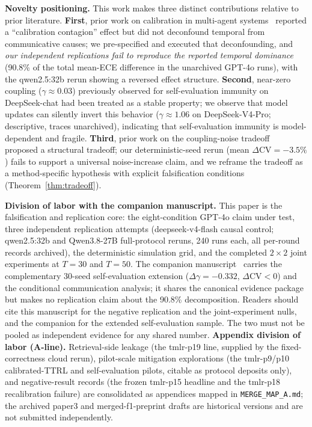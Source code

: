 \documentclass[11pt]{article}
\newcommand{\CV}{\ensuremath{\mathrm{CV}}}
\theoremstyle{definition}
\theoremstyle{remark}
\begin{document}
\textbf{Novelty positioning.} This work makes three distinct contributions relative to prior literature. \textbf{First}, prior work on calibration in multi-agent systems~\citep{huang2026cagecal,epc2026} reported a ``calibration contagion'' effect but did not deconfound temporal from communicative causes; we pre-specified and executed that deconfounding, and \emph{our independent replications fail to reproduce the reported temporal dominance} (90.8\% of the total mean-ECE difference in the unarchived GPT-4o runs), with the qwen2.5:32b rerun showing a reversed effect structure. \textbf{Second}, near-zero coupling ($\gamma \approx 0.03$) previously observed for self-evaluation immunity on DeepSeek-chat had been treated as a stable property; we observe that model updates can silently invert this behavior ($\gamma \approx 1.06$ on DeepSeek-V4-Pro; descriptive, traces unarchived), indicating that self-evaluation immunity is model-dependent and fragile. \textbf{Third}, prior work on the coupling-noise tradeoff~\citep{caleffects2026} proposed a structural tradeoff; our deterministic-seed rerun (mean $\Delta\CV = -3.5\%$) fails to support a universal noise-increase claim, and we reframe the tradeoff as a method-specific hypothesis with explicit falsification conditions (Theorem~\ref{thm:tradeoff}).

\textbf{Division of labor with the companion manuscript.} This paper is the falsification and replication core: the eight-condition GPT-4o claim under test, three independent replication attempts (deepseek-v4-flash causal control; qwen2.5:32b and Qwen3.8-27B full-protocol reruns, 240 runs each, all per-round records archived), the deterministic simulation grid, and the completed $2{\times}2$ joint experiments at $T{=}30$ and $T{=}50$. The companion manuscript~\citep{companion2026} carries the complementary 30-seed self-evaluation extension ($\Delta\gamma=-0.332$, $\Delta\CV<0$) and the conditional communication analysis; it shares the canonical evidence package but makes no replication claim about the 90.8\% decomposition. Readers should cite this manuscript for the negative replication and the joint-experiment nulls, and the companion for the extended self-evaluation sample. The two must not be pooled as independent evidence for any shared number. \textbf{Appendix division of labor (A-line).} Retrieval-side leakage (the tmlr-p19 line, supplied by the fixed-correctness cloud rerun), pilot-scale mitigation explorations (the tmlr-p9/p10 calibrated-TTRL and self-evaluation pilots, citable as protocol deposits only), and negative-result records (the frozen tmlr-p15 headline and the tmlr-p18 recalibration failure) are consolidated as appendices mapped in \texttt{MERGE\_MAP\_A.md}; the archived paper3 and merged-f1-preprint drafts are historical versions and are not submitted independently.
\end{document}
